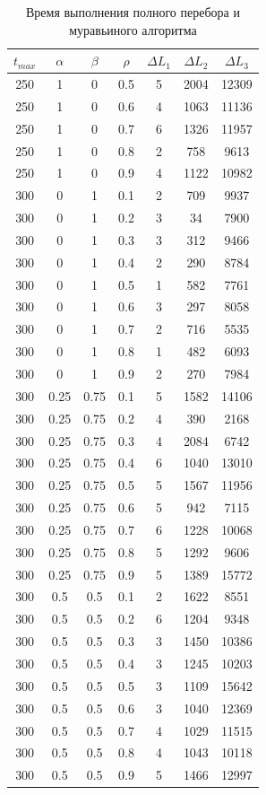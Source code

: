 \documentclass[a4paper,oneside,14pt]{extreport}
\begin{document}
\begin{table}[H]
\begin{center}
	\caption[]{\label{tbl:only} Время выполнения полного перебора и муравьиного алгоритма}
	\begin{tabular}{|c|c|c|c|c|c|c|}
		\hline
		$t_{max}$ & $\alpha$ & $\beta$ & $\rho$ & $\Delta L_{1}$ & $\Delta L_{2}$ & $\Delta L_{3}$\\
		\hline
		250 & 1 & 0 & 0.5 & 5 & 2004 & 12309 \\
		250 & 1 & 0 & 0.6 & 4 & 1063 & 11136 \\
		250 & 1 & 0 & 0.7 & 6 & 1326 & 11957 \\
		250 & 1 & 0 & 0.8 & 2 & 758 & 9613 \\
		250 & 1 & 0 & 0.9 & 4 & 1122 & 10982 \\
		300 & 0 & 1 & 0.1 & 2 & 709 & 9937 \\
		300 & 0 & 1 & 0.2 & 3 & 34 & 7900 \\
		300 & 0 & 1 & 0.3 & 3 & 312 & 9466 \\
		300 & 0 & 1 & 0.4 & 2 & 290 & 8784 \\
		300 & 0 & 1 & 0.5 & 1 & 582 & 7761 \\
		300 & 0 & 1 & 0.6 & 3 & 297 & 8058 \\
		300 & 0 & 1 & 0.7 & 2 & 716 & 5535 \\
		300 & 0 & 1 & 0.8 & 1 & 482 & 6093 \\
		300 & 0 & 1 & 0.9 & 2 & 270 & 7984 \\
		300 & 0.25 & 0.75 & 0.1 & 5 & 1582 & 14106 \\
		300 & 0.25 & 0.75 & 0.2 & 4 & 390 & 2168 \\
		300 & 0.25 & 0.75 & 0.3 & 4 & 2084 & 6742 \\
		300 & 0.25 & 0.75 & 0.4 & 6 & 1040 & 13010 \\
		300 & 0.25 & 0.75 & 0.5 & 5 & 1567 & 11956 \\
		300 & 0.25 & 0.75 & 0.6 & 5 & 942 & 7115 \\
		300 & 0.25 & 0.75 & 0.7 & 6 & 1228 & 10068 \\
		300 & 0.25 & 0.75 & 0.8 & 5 & 1292 & 9606 \\
		300 & 0.25 & 0.75 & 0.9 & 5 & 1389 & 15772 \\
		300 & 0.5 & 0.5 & 0.1 & 2 & 1622 & 8551 \\
		300 & 0.5 & 0.5 & 0.2 & 6 & 1204 & 9348 \\
		300 & 0.5 & 0.5 & 0.3 & 3 & 1450 & 10386 \\
		300 & 0.5 & 0.5 & 0.4 & 3 & 1245 & 10203 \\
		300 & 0.5 & 0.5 & 0.5 & 3 & 1109 & 15642 \\
		300 & 0.5 & 0.5 & 0.6 & 3 & 1040 & 12369 \\
		300 & 0.5 & 0.5 & 0.7 & 4 & 1029 & 11515 \\
		300 & 0.5 & 0.5 & 0.8 & 4 & 1043 & 10118 \\
		300 & 0.5 & 0.5 & 0.9 & 5 & 1466 & 12997 \\
		\hline	
	\end{tabular}
\end{center}
\end{table}
\end{document}
